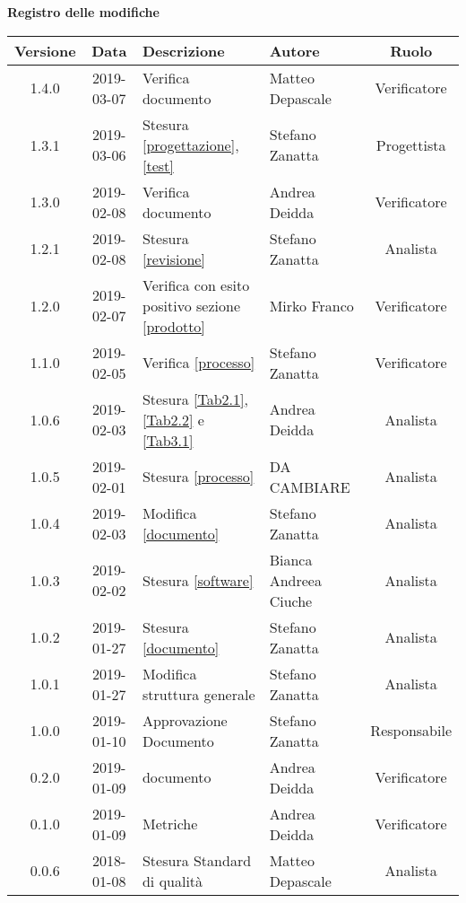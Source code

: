 	\begin{center}
		\textbf{Registro delle modifiche}
	\end{center}
	\begin{center}
		\begin{tabularx}{\textwidth}{|c|c|X|X|c|}
			\hline
			\textbf{Versione} & \textbf{Data} & \textbf{Descrizione} & \textbf{Autore} & \textbf{Ruolo} \\
			\hline
			1.4.0 & 2019-03-07 &  Verifica documento & Matteo Depascale & Verificatore \\
			\hline
			1.3.1 & 2019-03-06 &  Stesura \ref{progettazione},\ref{test} & Stefano Zanatta & Progettista \\
			\hline
			1.3.0 & 2019-02-08 &  Verifica documento & Andrea Deidda & Verificatore \\
			\hline
			1.2.1 & 2019-02-08 &  Stesura \ref{revisione} & Stefano Zanatta & Analista \\
			\hline
			1.2.0 & 2019-02-07 & Verifica con esito positivo sezione \ref{prodotto} & Mirko Franco & Verificatore \\
			\hline
			1.1.0 & 2019-02-05 & Verifica \ref{processo}& Stefano Zanatta & Verificatore\\
			\hline
			1.0.6 & 2019-02-03 & Stesura \ref{Tab2.1}, \ref{Tab2.2} e \ref{Tab3.1} & Andrea Deidda & Analista\\
			\hline
			1.0.5 & 2019-02-01 & Stesura \ref{processo}& DA CAMBIARE & Analista\\
			\hline
			1.0.4 & 2019-02-03 & Modifica \ref{documento}& Stefano Zanatta & Analista\\
			\hline
			1.0.3 & 2019-02-02 & Stesura \ref{software}& Bianca Andreea Ciuche & Analista\\
			\hline
			1.0.2 & 2019-01-27 & Stesura \ref{documento}& Stefano Zanatta & Analista\\
			\hline
			1.0.1 & 2019-01-27 & Modifica struttura generale& Stefano Zanatta & Analista\\
			\hline
			1.0.0 & 2019-01-10 & Approvazione Documento& Stefano Zanatta & Responsabile\\
			\hline
			0.2.0 & 2019-01-09 & \glossario{Verifica} documento & Andrea Deidda & Verificatore\\
			\hline
			0.1.0 & 2019-01-09 & \glossario{Verifica} Metriche & Andrea Deidda & Verificatore\\
			\hline
			0.0.6 & 2018-01-08 & Stesura Standard di qualità & Matteo Depascale & Analista\\

\end{tabularx}
\end{center}
